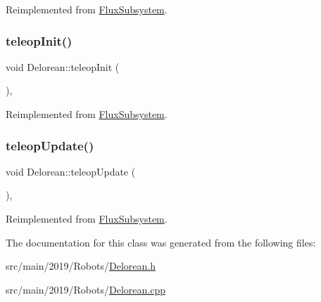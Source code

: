 Reimplemented from \hyperlink{classFluxSubsystem_ac2b1c08b53251870e945edf7080c1549}{Flux\+Subsystem}.

\mbox{\label{classDelorean_a789c6e4e70f4e2cfdf944d1a1a149509}} 
\subsubsection{\texorpdfstring{teleop\+Init()}{teleopInit()}}
{\footnotesize\ttfamily void Delorean\+::teleop\+Init (\begin{DoxyParamCaption}{ }\end{DoxyParamCaption})\hspace{0.3cm}{\ttfamily [override]}, {\ttfamily [virtual]}}



Reimplemented from \hyperlink{classFluxSubsystem_aec6d05e4f80c3783684598fb92ad2e55}{Flux\+Subsystem}.

\mbox{\label{classDelorean_a6053dfc106d71fcffa30bac0f5e9b5b8}} 
\subsubsection{\texorpdfstring{teleop\+Update()}{teleopUpdate()}}
{\footnotesize\ttfamily void Delorean\+::teleop\+Update (\begin{DoxyParamCaption}{ }\end{DoxyParamCaption})\hspace{0.3cm}{\ttfamily [override]}, {\ttfamily [virtual]}}



Reimplemented from \hyperlink{classFluxSubsystem_a327d76affc60699bfa62563e364e42f5}{Flux\+Subsystem}.



The documentation for this class was generated from the following files\+:\begin{DoxyCompactItemize}
\item 
src/main/2019/\+Robots/\hyperlink{Delorean_8h}{Delorean.\+h}\item 
src/main/2019/\+Robots/\hyperlink{Delorean_8cpp}{Delorean.\+cpp}\end{DoxyCompactItemize}
